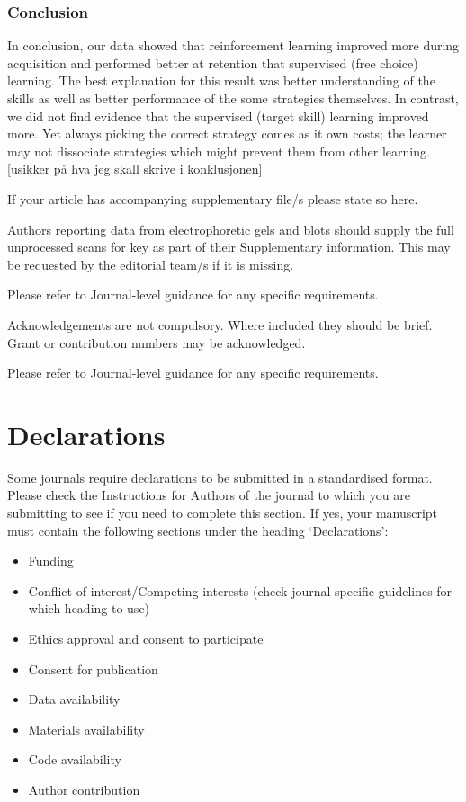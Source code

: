 \documentclass[pdflatex,sn-mathphys-num]{sn-jnl}%
\theoremstyle{thmstyleone}%
\theoremstyle{thmstyletwo}%
\theoremstyle{thmstylethree}%
\begin{document}
\subsubsection{Conclusion}

In conclusion, our data showed that reinforcement learning improved more during acquisition and performed better at retention that supervised (free choice) learning. The best explanation for this result was better understanding of the skills as well as better performance of the some strategies themselves. In contrast, we did not find evidence that the supervised (target skill) learning improved more. Yet always picking the correct strategy comes as it own costs; the learner may not dissociate strategies which might prevent them from other learning. [usikker på hva jeg skall skrive i konklusjonen]



\backmatter


If your article has accompanying supplementary file/s please state so here. 

Authors reporting data from electrophoretic gels and blots should supply the full unprocessed scans for key as part of their Supplementary information. This may be requested by the editorial team/s if it is missing.

Please refer to Journal-level guidance for any specific requirements.


Acknowledgements are not compulsory. Where included they should be brief. Grant or contribution numbers may be acknowledged.

Please refer to Journal-level guidance for any specific requirements.

\section*{Declarations}

Some journals require declarations to be submitted in a standardised format. Please check the Instructions for Authors of the journal to which you are submitting to see if you need to complete this section. If yes, your manuscript must contain the following sections under the heading `Declarations':

\begin{itemize}
\item Funding
\item Conflict of interest/Competing interests (check journal-specific guidelines for which heading to use)
\item Ethics approval and consent to participate
\item Consent for publication
\item Data availability 
\item Materials availability
\item Code availability 
\item Author contribution
\end{itemize}
\end{document}
